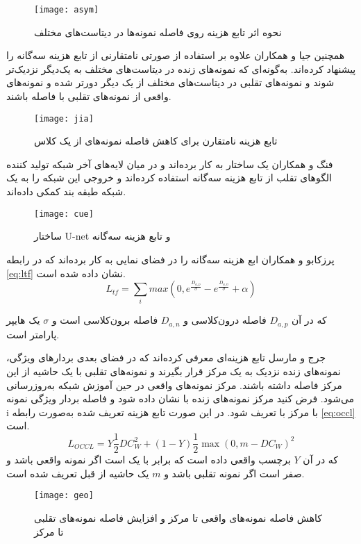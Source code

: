 \begin{figure}[h]
	\centerline{\texttt{[image: asym]}}
	\caption{نحوه اثر تابع هزینه روی فاصله نمونه‌ها در دیتاست‌های مختلف \cite{shao2019multi} }
	\label{fig:asym}
\end{figure}

همچنین جیا و همکاران
\cite{jia2020single}
 علاوه بر استفاده از  صورتی نامتقارنی از تابع هزینه سه‌گانه را پیشنهاد کرده‌اند. به‌گونه‌ای که نمونه‌های زنده در دیتاست‌های مختلف به یک‌دیگر نزدیک‌تر شوند و نمونه‌های تقلبی در دیتاست‌های مختلف از یک دیگر دورتر شده و نمونه‌های واقعی از نمونه‌های تقلبی با فاصله باشند. 
 
 \begin{figure}[h]
 	\centerline{\texttt{[image: jia]}}
 	\caption{تابع هزینه نامتقارن برای کاهش فاصله نمونه‌های از یک کلاس \cite{jia2020single} }
 	\label{fig:jia}
 \end{figure}

فنگ و همکاران
\cite{feng2020learning}
یک ساختار 
\cite{ronneberger2015u}
به کار برده‌اند و در میان لایه‌های آخر شبکه تولید کننده الگوهای تقلب از تابع هزینه سه‌گانه استفاده کرده‌اند و خروجی این شبکه  را به یک شبکه طبقه بند کمکی داده‌اند.

 \begin{figure}[h]
	\centerline{\texttt{[image: cue]}}
	\caption{ساختار U-net و تابع هزینه سه‌گانه \cite{feng2020learning} }
	\label{fig:cue}
\end{figure}

پرزکابو و همکاران
\cite{perez2019deep}
ابع هزینه سه‌گانه را در فضای نمایی به کار برده‌اند که در رابطه
\ref{eq:ltf}
نشان داده شده است.
 \begin{equation}\label{eq:ltf}
	L_{tf} = \sum_{i}{max(0,e^{\frac{D_{a,p}}{\sigma}}-e^{\frac{D_{a,n}}{\sigma}}+\alpha)}
\end{equation}

که در آن
$D_{a,p}$
فاصله درون‌کلاسی و
$D_{a,n}$
فاصله برون‌کلاسی است و
$\sigma$
یک هایپر پارامتر است.

جرج و مارسل
\cite{george2020learning} 
 تابع هزینه‌ای معرفی کرده‌اند که در فضای  بعدی بردارهای ویژگی، نمونه‌های زنده نزدیک به یک مرکز قرار بگیرند و نمونه‌های تقلبی با یک حاشیه از این مرکز فاصله داشته باشند. مرکز نمونه‌های واقعی در حین آموزش شبکه به‌روزرسانی می‌شود.
فرض کنید مرکز نمونه‌های زنده با  نشان داده شود و فاصله بردار ویژگی نمونه i با مرکز با  تعریف شود. در این صورت تابع هزینه تعریف شده به‌صورت رابطه
\ref{eq:occl}
است.
 \begin{equation}\label{eq:occl}
L_{OCCL}=Y\frac{1}{2}DC^2_W+(1-Y)\frac{1}{2}\max(0,m-DC_W)^2
\end{equation}
که در آن $Y$ برچسب واقعی داده است که برابر با یک است اگر نمونه واقعی باشد و صفر است اگر نمونه تقلبی باشد و $m$ یک حاشیه از قبل تعریف شده است.
 \begin{figure}[h]
	\centerline{\texttt{[image: geo]}}
	\caption{کاهش فاصله نمونه‌های واقعی تا مرکز و افزایش فاصله نمونه‌های تقلبی تا مرکز \cite{george2020learning} }
	\label{fig:geo}
\end{figure}


